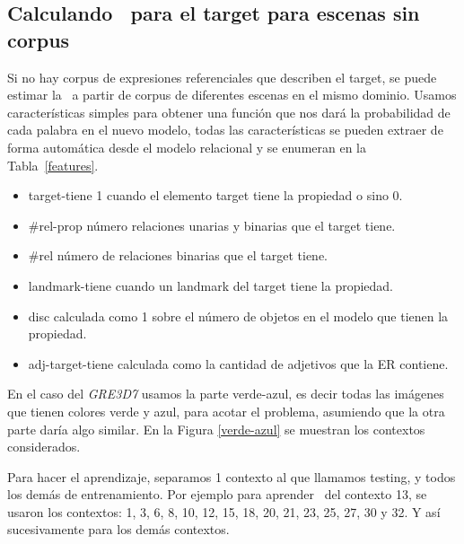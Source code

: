 \subsection{Calculando \puse\ para el target para escenas sin corpus } 
\label{subsec:learning}

%


Si no hay corpus de expresiones referenciales que describen el target, se puede estimar la \puse~a partir de corpus de
diferentes escenas en el mismo dominio.
Usamos caracter\'isticas simples para obtener una funci\'on que nos dar\'a la probabilidad de cada palabra en el nuevo modelo, todas las caracter\'isticas se pueden extraer de forma autom\'atica desde el modelo relacional y se enumeran en la Tabla~\ref{features}.

\begin{itemize}
\item target-tiene 1 cuando el elemento target tiene la propiedad o sino 0. 
\item \#rel-prop n\'umero relaciones unarias y binarias que el target tiene.
\item \#rel  n\'umero de relaciones binarias que el target tiene. 
\item landmark-tiene cuando un landmark del target tiene la propiedad.
\item disc calculada como 1 sobre el n\'umero de objetos en el modelo que tienen la propiedad.  
\item adj-target-tiene calculada como la cantidad de adjetivos que la ER contiene.
\end{itemize}

En el caso del \textit{GRE3D7} usamos la parte verde-azul, es decir todas las im\'agenes que tienen colores verde y azul, para acotar el problema, asumiendo que la otra parte dar\'ia algo similar. En la Figura \ref{verde-azul} se muestran los contextos considerados.

Para hacer el aprendizaje, separamos 1 contexto al que llamamos testing, y todos los dem\'as de entrenamiento. Por ejemplo para aprender \puse\ del contexto 13, se usaron los contextos: 1, 3, 6, 8, 10, 12, 15, 18, 20, 21, 23, 25, 27, 30 y 32. Y as\'i sucesivamente para los dem\'as contextos.

